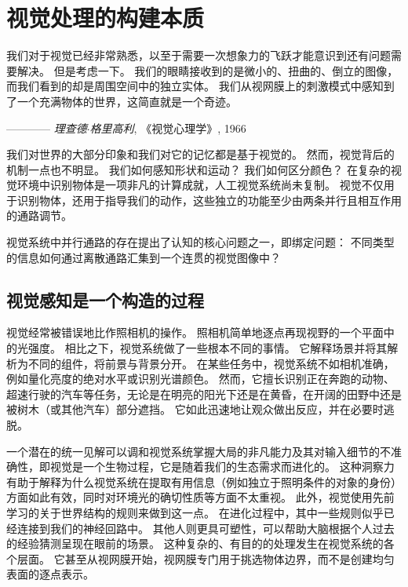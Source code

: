 \chapter{视觉处理的构建本质} \label{chap:chap21}

我们对于视觉已经非常熟悉，以至于需要一次想象力的飞跃才能意识到还有问题需要解决。
但是考虑一下。
我们的眼睛接收到的是微小的、扭曲的、倒立的图像，而我们看到的却是周围空间中的独立实体。
我们从视网膜上的刺激模式中感知到了一个充满物体的世界，这简直就是一个奇迹。

\begin{flushright}
	———— \textit{理查德$\cdot$格里高利}, 《视觉心理学》, 1966 \hfill
\end{flushright}



我们对世界的大部分印象和我们对它的记忆都是基于视觉的。
然而，视觉背后的机制一点也不明显。
我们如何感知形状和运动？
我们如何区分颜色？
在复杂的视觉环境中识别物体是一项非凡的计算成就，人工视觉系统尚未复制。
视觉不仅用于识别物体，还用于指导我们的动作，这些独立的功能至少由两条并行且相互作用的通路调节。


视觉系统中并行通路的存在提出了认知的核心问题之一，即绑定问题：
不同类型的信息如何通过离散通路汇集到一个连贯的视觉图像中？



\section{视觉感知是一个构造的过程}

视觉经常被错误地比作照相机的操作。
照相机简单地逐点再现视野的一个平面中的光强度。
相比之下，视觉系统做了一些根本不同的事情。
它解释场景并将其解析为不同的组件，将前景与背景分开。
在某些任务中，视觉系统不如相机准确，例如量化亮度的绝对水平或识别光谱颜色。
然而，它擅长识别正在奔跑的动物、超速行驶的汽车等任务，无论是在明亮的阳光下还是在黄昏，在开阔的田野中还是被树木（或其他汽车）部分遮挡。
它如此迅速地让观众做出反应，并在必要时逃脱。


一个潜在的统一见解可以调和视觉系统掌握大局的非凡能力及其对输入细节的不准确性，即视觉是一个生物过程，它是随着我们的生态需求而进化的。
这种洞察力有助于解释为什么视觉系统在提取有用信息（例如独立于照明条件的对象的身份）方面如此有效，同时对环境光的确切性质等方面不太重视。
此外，视觉使用先前学习的关于世界结构的规则来做到这一点。
在进化过程中，其中一些规则似乎已经连接到我们的神经回路中。
其他人则更具可塑性，可以帮助大脑根据个人过去的经验猜测呈现在眼前的场景。
这种复杂的、有目的的处理发生在视觉系统的各个层面。 
它甚至从视网膜开始，视网膜专门用于挑选物体边界，而不是创建均匀表面的逐点表示。


